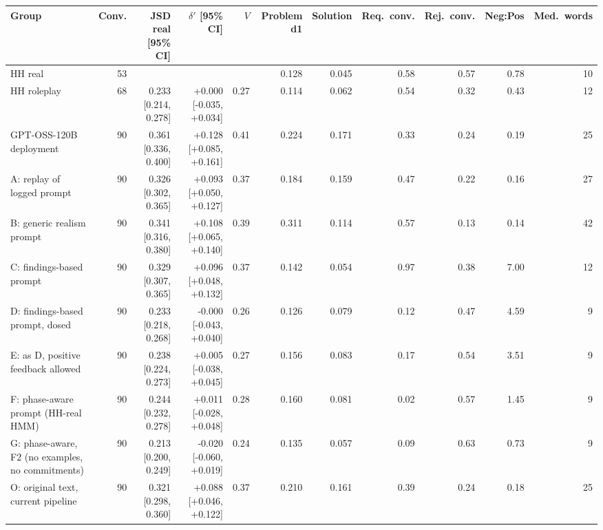 \begin{tabular}{lrrrrrrrrrr}
\toprule
Group & Conv. & JSD real [95\% CI] & $\delta'$ [95\% CI] & $V$ & Problem d1 & Solution & Req.\ conv. & Rej.\ conv. & Neg:Pos & Med.\ words \\
\midrule
HH real & 53 &  &  &  & 0.128 & 0.045 & 0.58 & 0.57 & 0.78 & 10 \\
HH roleplay & 68 & 0.233 [0.214, 0.278] & +0.000 [-0.035, +0.034] & 0.27 & 0.114 & 0.062 & 0.54 & 0.32 & 0.43 & 12 \\
GPT-OSS-120B deployment & 90 & 0.361 [0.336, 0.400] & +0.128 [+0.085, +0.161] & 0.41 & 0.224 & 0.171 & 0.33 & 0.24 & 0.19 & 25 \\
A: replay of logged prompt & 90 & 0.326 [0.302, 0.365] & +0.093 [+0.050, +0.127] & 0.37 & 0.184 & 0.159 & 0.47 & 0.22 & 0.16 & 27 \\
B: generic realism prompt & 90 & 0.341 [0.316, 0.380] & +0.108 [+0.065, +0.140] & 0.39 & 0.311 & 0.114 & 0.57 & 0.13 & 0.14 & 42 \\
C: findings-based prompt & 90 & 0.329 [0.307, 0.365] & +0.096 [+0.048, +0.132] & 0.37 & 0.142 & 0.054 & 0.97 & 0.38 & 7.00 & 12 \\
D: findings-based prompt, dosed & 90 & 0.233 [0.218, 0.268] & -0.000 [-0.043, +0.040] & 0.26 & 0.126 & 0.079 & 0.12 & 0.47 & 4.59 & 9 \\
E: as D, positive feedback allowed & 90 & 0.238 [0.224, 0.273] & +0.005 [-0.038, +0.045] & 0.27 & 0.156 & 0.083 & 0.17 & 0.54 & 3.51 & 9 \\
F: phase-aware prompt (HH-real HMM) & 90 & 0.244 [0.232, 0.278] & +0.011 [-0.028, +0.048] & 0.28 & 0.160 & 0.081 & 0.02 & 0.57 & 1.45 & 9 \\
G: phase-aware, F2 (no examples, no commitments) & 90 & 0.213 [0.200, 0.249] & -0.020 [-0.060, +0.019] & 0.24 & 0.135 & 0.057 & 0.09 & 0.63 & 0.73 & 9 \\
O: original text, current pipeline & 90 & 0.321 [0.298, 0.360] & +0.088 [+0.046, +0.122] & 0.37 & 0.210 & 0.161 & 0.39 & 0.24 & 0.18 & 25 \\
\bottomrule
\end{tabular}
